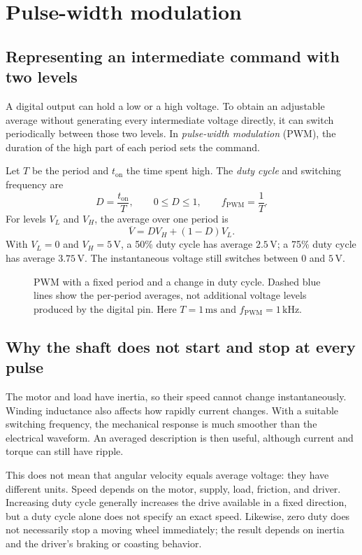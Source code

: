 \section{Pulse-width modulation}
\subsection{Representing an intermediate command with two levels}
A digital output can hold a low or a high voltage. To obtain an adjustable
average without generating every intermediate voltage directly, it can switch
periodically between those two levels. In \emph{pulse-width modulation}
(PWM), the duration of the high part of each period sets the command.

Let $T$ be the period and $t_{\mathrm{on}}$ the time spent high. The
\emph{duty cycle} and switching frequency are
\begin{equation}
 D=\frac{t_{\mathrm{on}}}{T},\qquad 0\le D\le1,
 \qquad f_{\mathrm{PWM}}=\frac1T.
\end{equation}
For levels $V_L$ and $V_H$, the average over one period is
\begin{equation}
 \overline V=DV_H+(1-D)V_L.
 \label{eq:l08-average}
\end{equation}
With $V_L=0$ and $V_H=5\,\mathrm V$, a 50\% duty cycle has average
$2.5\,\mathrm V$; a 75\% duty cycle has average $3.75\,\mathrm V$.
The instantaneous voltage still switches between 0 and $5\,\mathrm V$.

\begin{figure}[htbp]
\centering
\caption{PWM with a fixed period and a change in duty cycle. Dashed blue
lines show the per-period averages, not additional voltage levels produced
by the digital pin. Here $T=1\,\mathrm{ms}$ and $f_{\mathrm{PWM}}=1\,\mathrm{kHz}$.}
\label{fig:l08-pwm}
\end{figure}

\subsection{Why the shaft does not start and stop at every pulse}
The motor and load have inertia, so their speed cannot change instantaneously.
Winding inductance also affects how rapidly current changes. With a suitable
switching frequency, the mechanical response is much smoother than the
electrical waveform. An averaged description is then useful, although
current and torque can still have ripple.

This does not mean that angular velocity equals average voltage: they have
different units. Speed depends on the motor, supply, load, friction, and
driver. Increasing duty cycle generally increases the drive available in a
fixed direction, but a duty cycle alone does not specify an exact speed.
Likewise, zero duty does not necessarily stop a moving wheel immediately;
the result depends on inertia and the driver's braking or coasting behavior.

